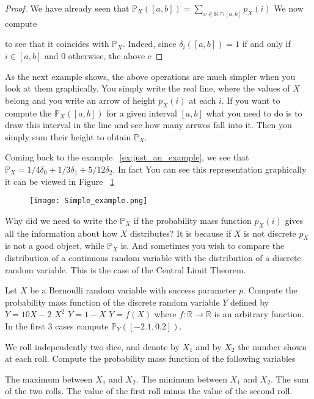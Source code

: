 \begin{proof}
We have already seen that 
$\mathbb P_X([a,b]) = \sum_{x \in \mathbb N \cap [a,b]} p_X(i)$
We now compute 

to see that it coincides with $\mathbb P_X$. Indeed, since $\delta_i ([a,b]) = 1$ if and only if $i \in [a,b]$ and 0 otherwise, the above e
\end{proof}
As the next example shows, the above operations are much simpler when you look at them graphically. You simply write the real line, where the values of $X$ belong and you write an arrow of height $p_X(i)$ at each $i$. If you want to compute the $\mathbb P_X([a,b])$ for a given interval $[a,b]$ what you need to do is to draw this interval in the line and see how many arrwos fall into it. Then you simply sum their height to obtain $\mathbb P_X$. 
\begin{example}
    Coming back to the example ~\ref{ex:just_an_example}, we see that 
    $\mathbb P_X = 1/4 \delta_0 + 1/3 \delta_1 + 5/12 \delta_2 $. In fact 
   You can see this representation graphically it can be viewed in Figure ~\ref{f:simple_example}
   \begin{figure}[h]
\texttt{[image: Simple\_example.png]}
\label{f:simple_example}
\end{figure}
\end{example}
Why did we need to write the $\mathbb P_X$ if the probability mass function $p_X(i)$ gives all the information about how $X$ distributes? It is because if $X$ is not discrete $p_X$ is not a good object, while $\mathbb P_X$ is. And sometimes you wish to compare the distribution of a continuous random variable with the distribution of a discrete random variable. This is the case of the Central Limit Theorem.

\begin{ExerciseList}

    \Exercise Let $X$ be a Bernoulli random variable with success parameter $p$. Compute the probability mass function of the discrete random variable $Y$ defined by
    \Question $ Y = 10X - 2$
    \Question $X^2 $
    \Question $ Y = 1 - X $
    \Question $ Y = f(X)$ where $f: \mathbb R \to \mathbb R$ is an arbitrary  function.
    \Question In the first 3 cases compute $\mathbb P_Y([-2.1,0.2])$. 
    
    \Exercise We roll independently two dice, and denote by $X_1$ and by $X_2$ the number shown at each roll. Compute the probability mass function of the following variables 
    
        \Question The maximum between $X_1$ and $X_2$.
        \Question The minimum between $X_1$ and $X_2$. 
        \Question The sum of the two rolls. 
        \Question The value of the first roll minus the value of the second roll. 
        
\end{ExerciseList}
